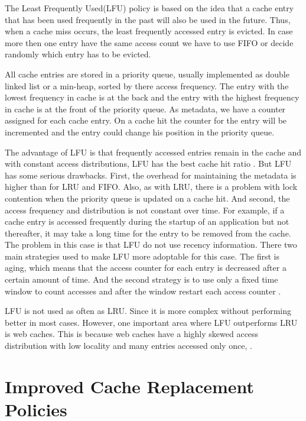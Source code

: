 \documentclass[
	12pt,
	a4paper,
	abstract,
	bibliography=totoc,
	chapterprefix,
	headings=openright,
	numbers=endperiod,
	parskip=half,
	twoside,
]{scrreprt}
\begin{document}
The Least Frequently Used(LFU) policy is based on the idea that a cache entry that has been used frequently in the past will also be used in the future.
Thus, when a cache miss occurs, the least frequently accessed entry is evicted.
In case more then one entry have the same access count we have to use FIFO or decide randomly which entry has to be evicted.

All cache entries are stored in a priority queue, usually implemented as double linked list or a min-heap, sorted by there access frequency.
The entry with the lowest frequency in cache is at the back and the entry with the highest frequency in cache is at the front of the priority queue.
As metadata, we have a counter assigned for each cache entry.
On a cache hit the counter for the entry will be incremented and the entry could change his position in the priority queue.

The advantage of LFU is that frequently accessed entries remain in the cache and with constant
access distributions, LFU has the best cache hit ratio \cite{einziger2017tinylfu}.
But LFU has some  serious drawbacks.
First, the overhead for maintaining the metadata is higher than for LRU and FIFO.
Also, as with LRU, there is a problem with lock contention when the priority queue is updated on a cache hit.
And second, the access frequency and distribution is not constant over time.
For example, if a cache entry is accessed frequently during the startup of an application but not thereafter, it may take a long time for the entry to be removed from the cache.
The problem in this case is that LFU do not use recency information.
There two main strategies used to make LFU more adoptable for this case.
The first is aging, which means that the access counter for each entry is decreased after  a certain amount of time.
And the second strategy is to use only a fixed time window to count accesses and after the window restart each access counter \cite{karakostas2000practical}.

LFU is not used as often as LRU.
Since it is more complex without performing better in most cases.
However, one important area where LFU outperforms LRU is web caches.
This is because web caches have a highly skewed access distribution with low locality and  
many entries accessed only once, \cite{mahanti2000traffic}.

\section{Improved Cache Replacement Policies}
\label{sec:improved cache replacement policies}
\end{document}
